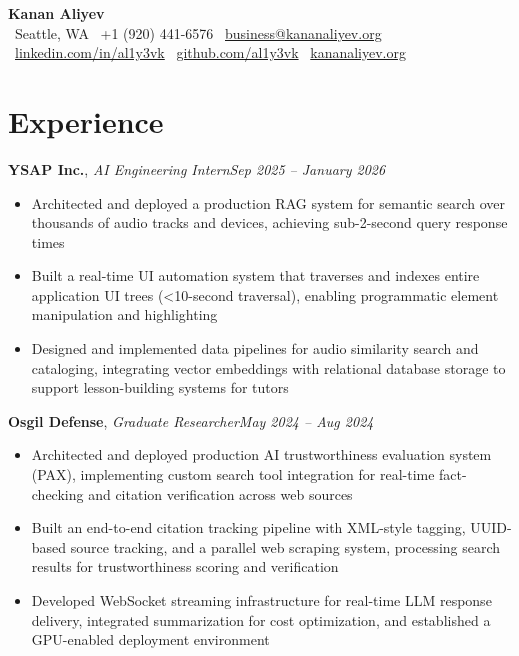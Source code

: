 \documentclass[11pt, letterpaper]{article}
\newcommand{\exphead}[3]{%
    \noindent\textbf{#1}, \textit{#2}\hfill\textit{#3}\\[-5pt]%
}
\begin{document}
\begin{center}
    {\LARGE\bfseries Kanan Aliyev}\\[6pt]
    {\small
    \faMapMarker*~Seattle, WA \quad
    \faPhone*~+1 (920) 441-6576 \quad
    \faEnvelope~\href{mailto:business@kananaliyev.org}{business@kananaliyev.org}\\[4pt]
    \faLinkedin~\href{https://www.linkedin.com/in/al1y3vk/}{linkedin.com/in/al1y3vk} \quad
    \faGithub~\href{https://github.com/al1y3vk}{github.com/al1y3vk} \quad
    \faGlobe~\href{https://kananaliyev.org}{kananaliyev.org}
    }
\end{center}

\vspace{2pt}

\section{Experience}

\exphead{YSAP Inc.}{AI Engineering Intern}{Sep 2025 -- January 2026}
\begin{itemize}
    \item Architected and deployed a production RAG system for semantic search over thousands of audio tracks and devices, achieving sub-2-second query response times
    \item Built a real-time UI automation system that traverses and indexes entire application UI trees ({<}10-second traversal), enabling programmatic element manipulation and highlighting
    \item Designed and implemented data pipelines for audio similarity search and cataloging, integrating vector embeddings with relational database storage to support lesson-building systems for tutors
\end{itemize}

\vspace{4pt}

\exphead{Osgil Defense}{Graduate Researcher}{May 2024 -- Aug 2024}
\begin{itemize}
    \item Architected and deployed production AI trustworthiness evaluation system (PAX), implementing custom search tool integration for real-time fact-checking and citation verification across web sources
    \item Built an end-to-end citation tracking pipeline with XML-style tagging, UUID-based source tracking, and a parallel web scraping system, processing search results for trustworthiness scoring and verification
    \item Developed WebSocket streaming infrastructure for real-time LLM response delivery, integrated summarization for cost optimization, and established a GPU-enabled deployment environment
\end{itemize}
\end{document}
